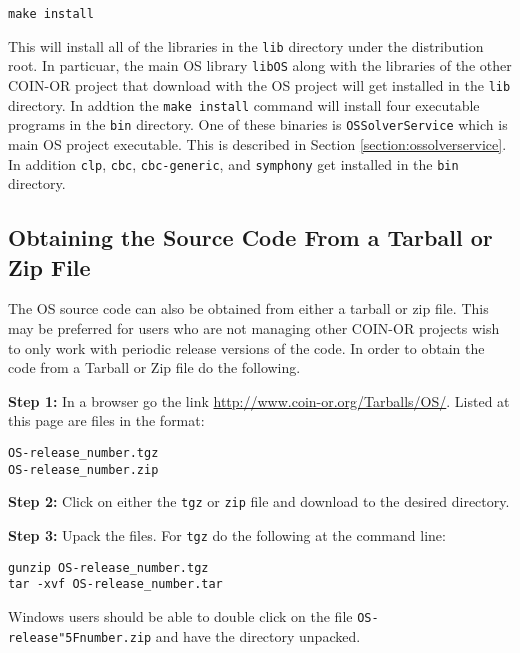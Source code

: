 \documentclass[11pt]{article}
\renewcommand{\_}{{\char"5F}}
\renewcommand{\{}{{\char"7B}}
\renewcommand{\}}{{\char"7D}}
\renewcommand{\^}{{\char"0D}}
\renewcommand{\'}{{\char"0D}}
\begin{document}
\begin{verbatim}
make install
\end{verbatim}

This will install all of the libraries in the {\tt lib} directory under the distribution root.  In particuar, the main OS library {\tt libOS} along with the libraries of the other COIN-OR project that download with the OS project will get installed in the {\tt lib} directory.  In addtion the {\tt make install} command will install four executable programs in the {\tt bin} directory.  One of these binaries is {\tt OSSolverService} which is main OS project executable. This is described in Section \ref{section:ossolverservice}. In addition {\tt clp}, {\tt cbc}, {\tt cbc-generic}, and {\tt symphony} get installed  in the {\tt bin} directory. 

\subsection{Obtaining the Source Code From a Tarball or Zip File}

The OS source code can also be obtained from either a  tarball or zip file.  This may be preferred for users who are not managing other COIN-OR projects wish to only work with periodic release versions of the code.  In order to obtain the code from a Tarball or Zip file do the following. 

\vskip 8pt

{\bf Step 1:} In a browser go the link \url{http://www.coin-or.org/Tarballs/OS/}.  Listed at this page are files in the format:

\begin{verbatim}
OS-release_number.tgz
OS-release_number.zip
\end{verbatim}

\vskip 8pt

{\bf Step 2:} Click on either the {\tt tgz} or {\tt zip} file and download to the desired directory.

\vskip 8pt

{\bf Step 3:} Upack the files. For {\tt tgz} do the following at the command line:
\begin{verbatim}
gunzip OS-release_number.tgz
tar -xvf OS-release_number.tar
\end{verbatim}

Windows users should be  able to double click on the file {\tt OS-release\_number.zip} and have the directory unpacked. 

\vskip 8pt
\end{document}
